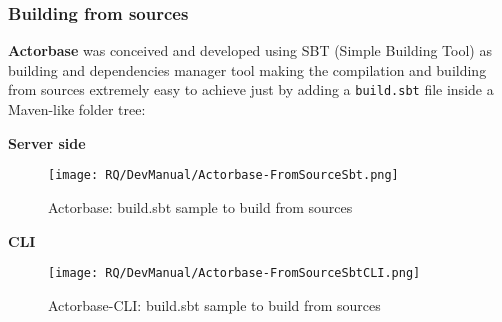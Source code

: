 \documentclass{scalatekids-article}
\begin{document}
\subsubsection{Building from sources}

\textbf{Actorbase} was conceived and developed using SBT (Simple Building Tool) as building and dependencies
manager tool making the compilation and building from sources extremely easy to achieve just by adding a
\verb=build.sbt= file inside a Maven-like folder tree:

\textbf{Server side}

\begin{figure}[H]
  \begin{center}
    \texttt{[image: RQ/DevManual/Actorbase-FromSourceSbt.png]}
    \caption{Actorbase: build.sbt sample to build from sources}
  \end{center}
\end{figure}

\textbf{CLI}

\begin{figure}[H]
  \begin{center}
    \texttt{[image: RQ/DevManual/Actorbase-FromSourceSbtCLI.png]}
    \caption{Actorbase-CLI: build.sbt sample to build from sources}
  \end{center}
\end{figure}
\end{document}
